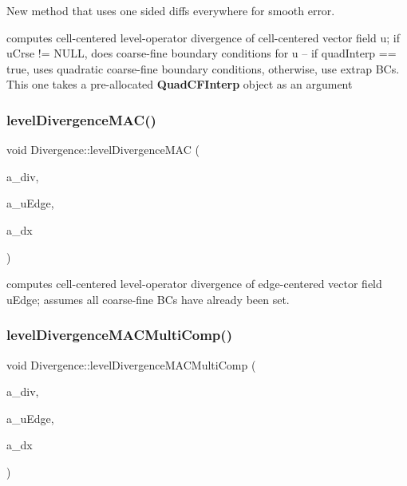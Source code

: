 New method that uses one sided diffs everywhere for smooth error.

computes cell-\/centered level-\/operator divergence of cell-\/centered vector field u; if u\+Crse != N\+U\+LL, does coarse-\/fine boundary conditions for u -- if quad\+Interp == true, uses quadratic coarse-\/fine boundary conditions, otherwise, use extrap BC\textquotesingle{}s. This one takes a pre-\/allocated \textbf{ Quad\+C\+F\+Interp} object as an argument \mbox{\label{class_divergence_a9004d4f62127cfaecab354769b4fcd58}} 
\subsubsection{\texorpdfstring{level\+Divergence\+M\+A\+C()}{levelDivergenceMAC()}}
{\footnotesize\ttfamily void Divergence\+::level\+Divergence\+M\+AC (\begin{DoxyParamCaption}\item[{\textbf{ Level\+Data}$<$ \textbf{ F\+Array\+Box} $>$ \&}]{a\+\_\+div,  }\item[{const \textbf{ Level\+Data}$<$ \textbf{ Flux\+Box} $>$ \&}]{a\+\_\+u\+Edge,  }\item[{const \textbf{ Real}}]{a\+\_\+dx }\end{DoxyParamCaption})\hspace{0.3cm}{\ttfamily [static]}}

computes cell-\/centered level-\/operator divergence of edge-\/centered vector field u\+Edge; assumes all coarse-\/fine BC\textquotesingle{}s have already been set. \mbox{\label{class_divergence_a6e222e89a13a45cbc06f380302aebf13}} 
\subsubsection{\texorpdfstring{level\+Divergence\+M\+A\+C\+Multi\+Comp()}{levelDivergenceMACMultiComp()}}
{\footnotesize\ttfamily void Divergence\+::level\+Divergence\+M\+A\+C\+Multi\+Comp (\begin{DoxyParamCaption}\item[{\textbf{ Level\+Data}$<$ \textbf{ F\+Array\+Box} $>$ \&}]{a\+\_\+div,  }\item[{const \textbf{ Level\+Data}$<$ \textbf{ Flux\+Box} $>$ \&}]{a\+\_\+u\+Edge,  }\item[{const \textbf{ Real}}]{a\+\_\+dx }\end{DoxyParamCaption})\hspace{0.3cm}{\ttfamily [static]}}



